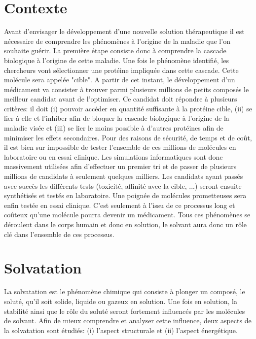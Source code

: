 \section{Contexte}
Avant d'envisager le développement d'une nouvelle solution thérapeutique il est nécessaire de comprendre les phénomènes à l'origine de la maladie que l'on souhaite guérir. La première étape consiste donc à comprendre la cascade biologique à l'origine de cette maladie. Une fois le phénomène identifié, les chercheurs vont sélectionner une protéine impliquée dans cette cascade. Cette molécule sera appelée "cible". A partir de cet instant, le développement d'un médicament va consister à trouver  parmi plusieurs millions de petits composés le meilleur candidat avant de l'optimiser. Ce candidat doit répondre à plusieurs critères: il doit (i) pouvoir accéder en quantité suffisante à la protéine cible, (ii) se lier à elle et l'inhiber afin de bloquer la cascade biologique à l'origine de la maladie visée et (iii) se lier le moins possible à d'autres protéines afin de minimiser les effets secondaires. Pour des raisons de sécurité, de temps et de coût, il est bien sur impossible de tester l'ensemble de ces millions de molécules en laboratoire ou en essai clinique. Les simulations informatiques sont donc massivement utilisées afin d'effectuer un premier tri et de passer de plusieurs millions de candidats à seulement quelques milliers. Les candidats ayant passés avec succès les différents tests (toxicité, affinité avec la cible, ...) seront ensuite synthétisés et testés en laboratoire. Une poignée de molécules prometteuses sera enfin testée en essai clinique. C'est seulement à l'issu de ce processus long et coûteux qu'une molécule pourra devenir un médicament. Tous ces phénomènes se déroulent dans le corps humain et donc en solution, le solvant aura donc un rôle clé dans l'ensemble de ces processus.



\section{Solvatation}
La solvatation est le phénomène chimique qui consiste à plonger un composé, le soluté, qu'il soit solide, liquide ou gazeux en solution. Une fois en solution, la stabilité ainsi que le rôle du soluté seront fortement influencés par les molécules de solvant\cite{NickPace_protein_2004, levy_water_2004, Meyer_internal_1992, Ladbury_just_1996, GarcaSosa_hydration_2013, Lemieux_how_1996, Tame_role_1996, Li_effect_2005, Snyder_mechanism_2011, Wang_ligand_2011, Mobley_binding_2009, Barillari2007, Olano_hydration_2004, Bren_individual_2012, Ahmed_bound_2011, VAIANA_molecular_2006, Genheden_accurate_2011, Abel_contribution_2011, Biela_ligand_2012, Stegmann_thermodynamic_2009}. Afin de mieux comprendre et analyser cette influence, deux aspects de la solvatation sont étudiés: (i) l'aspect structurale et (ii) l'aspect énergétique. 

